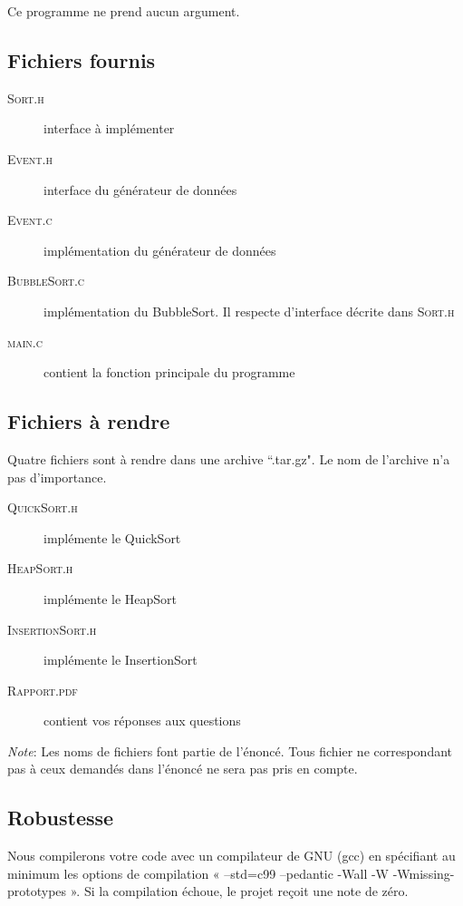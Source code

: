\documentclass[a4paper,10pt]{article}
\begin{document}
Ce programme ne prend aucun argument.

\subsection*{Fichiers fournis}
\begin{description}
\item[\textsc{Sort.h}] interface à implémenter
\item[\textsc{Event.h}] interface du générateur de données
\item[\textsc{Event.c}] implémentation du générateur de données
\item[\textsc{BubbleSort.c}] implémentation du BubbleSort. Il respecte d'interface décrite dans \textsc{Sort.h}
\item[\textsc{main.c}] contient la fonction principale du programme
\end{description}
\subsection*{Fichiers à rendre}
Quatre fichiers sont à rendre dans une archive ``.tar.gz". Le nom de l'archive n'a pas d'importance.
\begin{description}
\item[\textsc{QuickSort.h}] implémente le QuickSort
\item[\textsc{HeapSort.h}] implémente le HeapSort
\item[\textsc{InsertionSort.h}] implémente le InsertionSort
\item[\textsc{Rapport.pdf}] contient vos réponses aux questions
\end{description}

{\em Note}: Les noms de fichiers font partie de l'énoncé. Tous fichier ne correspondant pas à ceux demandés dans l'énoncé ne sera pas pris en compte.

\subsection*{Robustesse}
Nous compilerons votre code avec un compilateur de GNU (gcc) en spécifiant au minimum les options de compilation « --std=c99 --pedantic -Wall -W -Wmissing-prototypes ». Si la compilation échoue, le projet reçoit une note de zéro.
\end{document}
